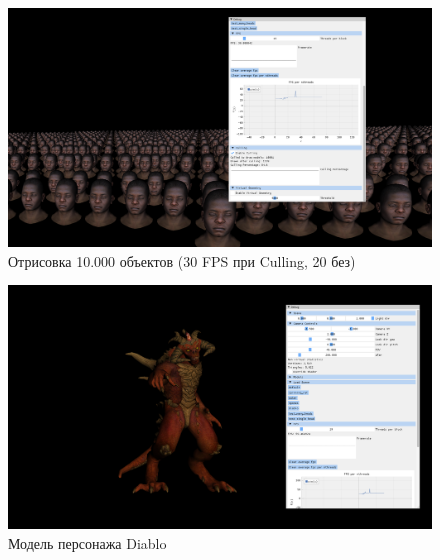 \begin{figure}[H]
	\begin{center}
		\includegraphics[scale=0.30]{img/i2.png}
	\end{center}
	\captionsetup{justification=centering}
	\caption{Отрисовка 10.000 объектов (30 FPS при Culling, 20 без)}
	\label{img:10k_negroes}
\end{figure}

\begin{figure}[H]
	\begin{center}
		\includegraphics[scale=0.30]{img/i4.png}
	\end{center}
	\captionsetup{justification=centering}
	\caption{Модель персонажа Diablo}
	\label{img:diablo}
\end{figure}

